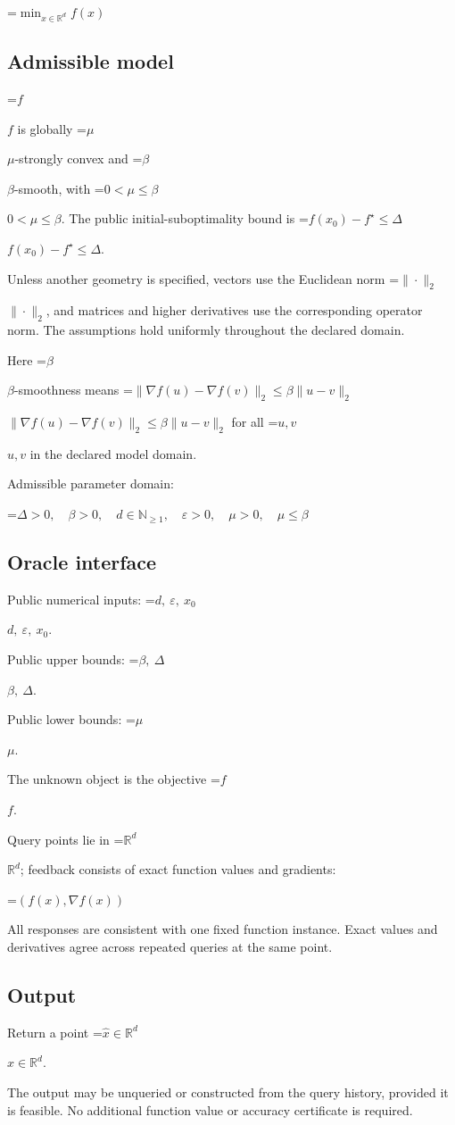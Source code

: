 \documentclass[10pt,a4paper]{article}
\newcommand{\AtlasMath}[1]{\par\begingroup\centering\setbox0=\hbox{$\displaystyle #1$}\ifdim\wd0>1.4\linewidth\typeout{ATLAS WIDE FORMULA: \the\wd0}\fi\ifdim\wd0>\linewidth\resizebox{\linewidth}{!}{\box0}\else\box0\fi\par\endgroup}
\newcommand{\AtlasInlineMath}[1]{\begingroup\setbox0=\hbox{$#1$}\ifdim\wd0>.4\linewidth\endgroup\AtlasMath{#1}\else\endgroup$#1$\fi}
\begin{document}
\AtlasMath{\min_{x\in \mathbb{R}^d}f(x)}


\subsection{Admissible model}
\AtlasInlineMath{f} is globally \AtlasInlineMath{\mu}-strongly convex and \AtlasInlineMath{\beta}-smooth, with \AtlasInlineMath{0<\mu\le\beta}. The public initial-suboptimality bound is \AtlasInlineMath{f(x_0)-f^\star\le\Delta}.

Unless another geometry is specified, vectors use the Euclidean norm \AtlasInlineMath{\|\cdot\|_2}, and matrices and higher derivatives use the corresponding operator norm. The assumptions hold uniformly throughout the declared domain.

Here \AtlasInlineMath{\beta}-smoothness means \AtlasInlineMath{\|\nabla f(u)-\nabla f(v)\|_2\le\beta\|u-v\|_2} for all \AtlasInlineMath{u,v} in the declared model domain.

Admissible parameter domain:


\AtlasMath{\Delta>0,\quad \beta>0,\quad d\in\mathbb{N}_{\ge1},\quad \varepsilon>0,\quad \mu>0,\quad \mu\le\beta}


\subsection{Oracle interface}
Public numerical inputs: \AtlasInlineMath{d,\ \varepsilon,\ x_0}.

Public upper bounds: \AtlasInlineMath{\beta,\ \Delta}.

Public lower bounds: \AtlasInlineMath{\mu}.

The unknown object is the objective \AtlasInlineMath{f}.

Query points lie in \AtlasInlineMath{\mathbb{R}^d}; feedback consists of exact function values and gradients:


\AtlasMath{(f(x),\nabla f(x))}


All responses are consistent with one fixed function instance. Exact values and derivatives agree across repeated queries at the same point.

\subsection{Output}
Return a point \AtlasInlineMath{\widehat x\in\mathbb R^d}.

The output may be unqueried or constructed from the query history, provided it is feasible. No additional function value or accuracy certificate is required.
\end{document}
